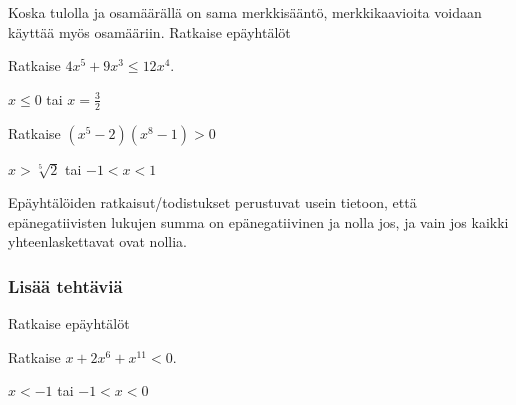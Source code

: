 \begin{tehtavasivu}
\begin{tehtava}
    Koska tulolla ja osamäärällä on sama merkkisääntö, merkkikaavioita voidaan käyttää myös osamääriin. Ratkaise epäyhtälöt
    \begin{vastaus}
    \end{vastaus}
\end{tehtava}

\begin{tehtava}
    Ratkaise $4x^5+9 x^3 \le 12 x^4$.
    \begin{vastaus}
        $x\le0$ tai $x=\frac{3}{2}$
    \end{vastaus}
\end{tehtava}

\begin{tehtava}
Ratkaise $(x^5-2)(x^8-1) >0$
\begin{vastaus}
$x > \sqrt[5]{2}$ tai $-1<x<1$
\end{vastaus}
\end{tehtava}

\begin{tehtava}
Epäyhtälöiden ratkaisut/todistukset perustuvat usein tietoon, että epänegatiivisten lukujen summa on epänegatiivinen ja nolla jos, ja vain jos kaikki yhteenlaskettavat ovat nollia.


\begin{vastaus}
\end{vastaus}
\end{tehtava}

\subsubsection*{Lisää tehtäviä}

\begin{tehtava} %
Ratkaise epäyhtälöt
    \begin{vastaus}
    \end{vastaus}
\end{tehtava}

\begin{tehtava}
    Ratkaise $x+2x^6+x^{11}<0$.
    \begin{vastaus}
        $x<-1$ tai $ -1<x<0$
    \end{vastaus}
\end{tehtava}

\end{tehtavasivu}